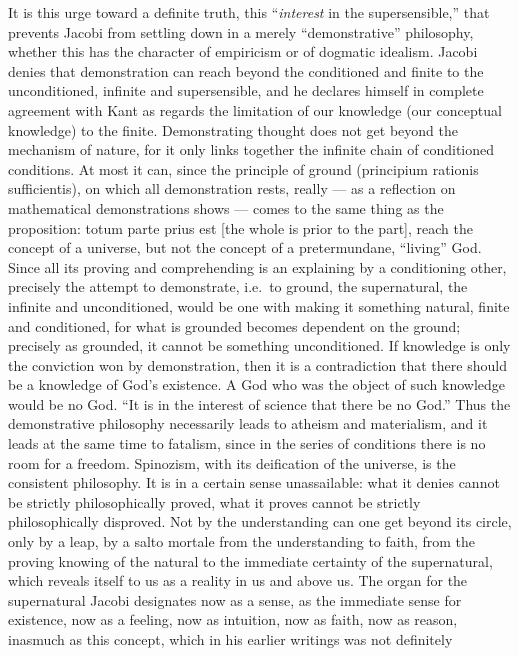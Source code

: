 It is this urge toward a definite truth, this ``\emph{interest} in the
supersensible,'' that prevents Jacobi from settling down in a merely
``demonstrative'' philosophy, whether this has the character of
empiricism or of dogmatic idealism. Jacobi denies that demonstration
can reach beyond the conditioned and finite to the unconditioned,
infinite and supersensible, and he declares himself in complete
agreement with Kant as regards the limitation of our knowledge (our
conceptual knowledge) to the finite. Demonstrating thought does not get
beyond the mechanism of nature, for it only links together the
infinite chain of conditioned conditions. At most it can, since the
principle of ground (principium rationis sufficientis), on which all
demonstration rests, really --- as a reflection on mathematical
demonstrations shows --- comes to the same thing as the proposition:
totum parte prius est [the whole is prior to the part], reach the
concept of a universe, but not the concept of a pretermundane,
``living'' God. Since all its proving and comprehending is an
explaining by a conditioning other, precisely the attempt to
demonstrate, i.e.\ to ground, the supernatural, the infinite and
unconditioned, would be one with making it something natural, finite
and conditioned, for what is grounded becomes dependent on the ground;
precisely as grounded, it cannot be something unconditioned. If
knowledge is only the conviction won by demonstration, then it is a
contradiction that there should be a knowledge of God's existence. A
God who was the object of such knowledge would be no God. ``It is in
the interest of science that there be no God.'' Thus the
demonstrative philosophy necessarily leads to atheism and materialism,
and it leads at the same time to fatalism, since in the series of
conditions there is no room for a freedom. Spinozism, with its
deification of the universe, is the consistent philosophy. It is in a
certain sense unassailable: what it denies cannot be strictly
philosophically proved, what it proves cannot be strictly
philosophically disproved. Not by the understanding can one get beyond
its circle, only by a leap, by a salto mortale from the understanding
to faith, from the proving knowing of the natural to the immediate
certainty of the supernatural, which reveals itself to us as a reality
in us and above us. The organ for the supernatural Jacobi designates
now as a sense, as the immediate sense for existence, now as a
feeling, now as intuition, now as faith, now as reason, inasmuch as
this concept, which in his earlier writings was not definitely
